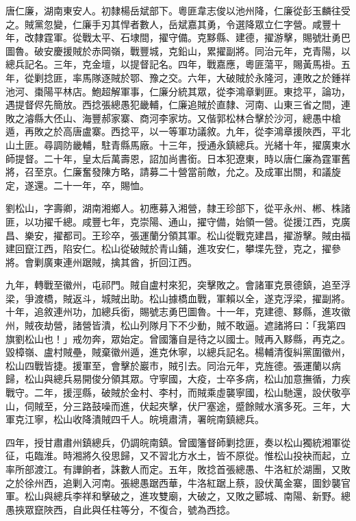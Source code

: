 \begin{pinyinscope}
唐仁廉，湖南東安人。初隸楊岳斌部下。粵匪韋志俊以池州降，仁廉從彭玉麟往受之。賊黨忽變，仁廉手刃其悍者數人，岳斌嘉其勇，令選降眾立仁字營。咸豐十年，改隸霆軍。從戰太平、石埭間，擢守備。克黟縣、建德，擢游擊，賜號壯勇巴圖魯。破安慶援賊於赤岡嶺，戰豐城，克鉛山，累擢副將。同治元年，克青陽，以總兵記名。三年，克金壇，以提督記名。四年，戰嘉應，粵匪蕩平，賜黃馬褂。五年，從剿捻匪，率馬隊逐賊於鄂、豫之交。六年，大破賊於永隆河，連敗之於鍾祥池河、棗陽平林店。鮑超解軍事，仁廉分統其眾，從李鴻章剿匪。東捻平，論功，遇提督侭先簡放。西捻張總愚犯畿輔，仁廉追賊於直隸、河南、山東三省之間，連敗之濬縣大伾山、海豐郝家寨、商河李家坊。又偕郭松林合擊於沙河，總愚中槍遁，再敗之於高唐盧寨。西捻平，以一等軍功議敘。九年，從李鴻章援陜西，平北山土匪。尋調防畿輔，駐青縣馬廠。十三年，授通永鎮總兵。光緒十年，擢廣東水師提督。二十年，皇太后萬壽恩，詔加尚書銜。日本犯遼東，時以唐仁廉為霆軍舊將，召至京。仁廉奮發陳方略，請募二十營當前敵，允之。及成軍出關，和議旋定，遂還。二十一年，卒，賜恤。

劉松山，字壽卿，湖南湘鄉人。初應募入湘營，隸王珍部下，從平永州、郴、株諸匪，以功擢千總。咸豐七年，克崇陽、通山，擢守備，始領一營。從援江西，克廣昌、樂安，擢都司。王珍卒，張運蘭分領其軍。松山從戰克建昌，擢游擊。賊由福建回竄江西，陷安仁。松山從破賊於青山鋪，進攻安仁，攀堞先登，克之，擢參將。會剿廣東連州踞賊，擒其酋，折回江西。

九年，轉戰至徽州，屯祁門。賊自盧村來犯，突擊敗之。會諸軍克景德鎮，追至浮梁，爭渡橋，賊返斗，城賊出助。松山據橋血戰，軍賴以全，遂克浮梁，擢副將。十年，追敘連州功，加總兵銜，賜號志勇巴圖魯。十一年，克建德、黟縣，進攻徽州，賊夜劫營，諸營皆潰，松山列隊月下不少動，賊不敢逼。遮諸將曰：「我第四旗劉松山也！」戒勿奔，眾始定。曾國籓自是待之以國士。賊再入黟縣，再克之。毀樟嶺、盧村賊壘，賊棄徽州遁，進克休寧，以總兵記名。楊輔清復糾黨圍徽州，松山四戰皆捷。援軍至，會擊於巖市，賊引去。同治元年，克旌德。張運蘭以病歸，松山與總兵易開俊分領其眾。守寧國，大疫，士卒多病，松山加意撫循，力疾戰守。二年，援涇縣，破賊於金村、李村，而賊乘虛襲寧國，松山馳還，設伏敬亭山，伺賊至，分三路鼓噪而進，伏起夾擊，伏尸塞途，蹙餘賊水濱多死。三年，大軍克江寧，松山收降潰賊四千人。皖境肅清，署皖南鎮總兵。

四年，授甘肅肅州鎮總兵，仍調皖南鎮。曾國籓督師剿捻匪，奏以松山獨統湘軍從征，屯臨淮。時湘將久役思歸，又不習北方水土，皆不原從。惟松山投袂而起，立率所部渡江。有譁餉者，誅數人而定。五年，敗捻首張總愚、牛洛紅於湖團，又敗之於徐州西，追剿入河南。張總愚踞西華，牛洛紅踞上蔡，設伏萬金寨，圖鈔襲官軍。松山與總兵李祥和擊破之，進攻雙廟，大破之，又敗之郾城、南陽、新野。總愚挾眾竄陜西，自此與任柱等分，不復合，號為西捻。


\end{pinyinscope}
